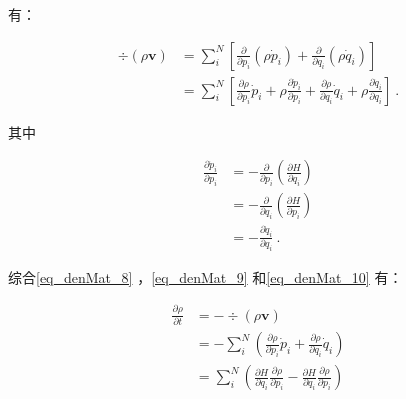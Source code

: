 有：

\begin{equation}\label{eq_denMat_9}
\begin{aligned}
\div\left(\rho\mathbf{v}\right)&= \sum_i^N\left[
    \frac{\partial}{\partial p_i}\left( \rho \dot{p}_i \right) + 
    \frac{\partial}{\partial q_i}\left( \rho \dot{q}_i \right)
    \right] \\
&=\sum_i^N\left[
    \frac{\partial\rho}{\partial p_i}\dot{p}_i +
    \rho \frac{\partial \dot{p}_i}{\partial p_i} +
    \frac{\partial\rho}{\partial q_i}\dot{q}_i +
    \rho \frac{\partial \dot{q}_i}{\partial q_i}
    \right]~.
\end{aligned}~
\end{equation}

其中

\begin{equation}\label{eq_denMat_10}
\begin{aligned}
\frac{\partial \dot{p}_i}{\partial p_i} 
&= -\frac{\partial}{\partial p_i}\left(\frac{\partial H}{\partial q_i}\right) \\
&= -\frac{\partial}{\partial q_i}\left(\frac{\partial H}{\partial p_i}\right) \\
&= -\frac{\partial \dot{q}_i}{\partial q_i}~.
\end{aligned}~
\end{equation}

综合\autoref{eq_denMat_8} ，\autoref{eq_denMat_9} 和\autoref{eq_denMat_10} 有：

\begin{equation}
\begin{aligned}
\frac{\partial \rho}{\partial t}&=-\div \left(\rho \mathbf{v}\right) \\
&= - \sum_i^N\left(\frac{\partial \rho}{\partial p_i}\dot{p}_i + \frac{\partial \rho}{\partial q_i}\dot{q}_i\right)\\
&= \sum_i^N\left(\frac{\partial H}{\partial q_i}\frac{\partial \rho}{\partial p_i} - \frac{\partial H}{\partial q_i}\frac{\partial \rho}{\partial p_i}\right)
\end{aligned}~
\end{equation}




